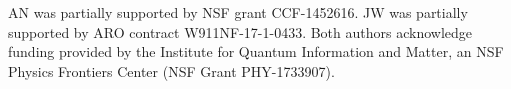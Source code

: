 AN was partially supported by NSF grant CCF-1452616.  JW was partially
supported by ARO contract W911NF-17-1-0433. Both authors acknowledge funding provided by the Institute for Quantum Information and Matter, an NSF Physics Frontiers Center (NSF Grant PHY-1733907).




